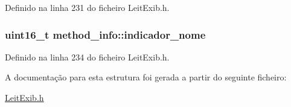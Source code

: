 Definido na linha 231 do ficheiro Leit\-Exib.\-h.

\hypertarget{structmethod__info_af759f4abed4c00637446765268f8c4cf}{
\subsubsection[{indicador\-\_\-nome}]{\setlength{\rightskip}{0pt plus 5cm}uint16\-\_\-t method\-\_\-info\-::indicador\-\_\-nome}}\label{structmethod__info_af759f4abed4c00637446765268f8c4cf}


Definido na linha 234 do ficheiro Leit\-Exib.\-h.



A documentação para esta estrutura foi gerada a partir do seguinte ficheiro\-:\begin{DoxyCompactItemize}
\item 
\hyperlink{_leit_exib_8h}{Leit\-Exib.\-h}\end{DoxyCompactItemize}
